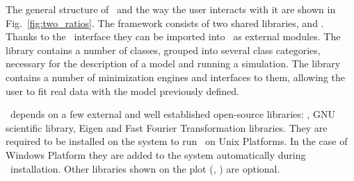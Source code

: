 The general structure of \BornAgain\ and the way the user interacts with it are
shown in Fig.~\ref{fig:two_ratios}.
The framework consists of two shared libraries,  and
. Thanks to the \Python\ interface they can be imported into \Python\ as external modules. The library  contains a number of classes, grouped into several class categories, necessary for the description of a model and running a simulation.
The library   contains a number of minimization engines 
and interfaces to them, allowing the user to fit real data with the model previously defined.

\BornAgain\ depends on a few external and well established
open-source libraries: , GNU scientific library, Eigen and
Fast Fourier Transformation libraries. They are required to be
installed on the system to run \BornAgain\ on Unix Platforms. In the
case of Windows Platform they are added to the system automatically during \BornAgain\ installation. Other libraries shown
on the plot (, ) are optional.

 







